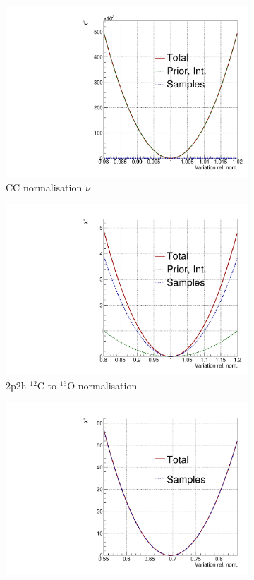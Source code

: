 \begin{figure}[!htbp]
\centering
\begin{subfigure}{.49\textwidth}
  \centering
  \includegraphics[width=0.7\linewidth]{figs/llh/CC_norm_nu_llh.pdf}
  \caption{CC normalisation $\nu$}
\end{subfigure}
\begin{subfigure}{.49\textwidth}
  \centering
  \includegraphics[width=0.7\linewidth]{figs/llh/2p2h_normCtoO_llh.pdf}
  \caption{2p2h $^{12}$C  to $^{16}$O normalisation}
\end{subfigure}
\begin{subfigure}{.49\textwidth}
  \centering
  \includegraphics[width=0.7\linewidth]{figs/llh/Q2_norm_1_llh.pdf}

\end{subfigure}
\end{figure}
